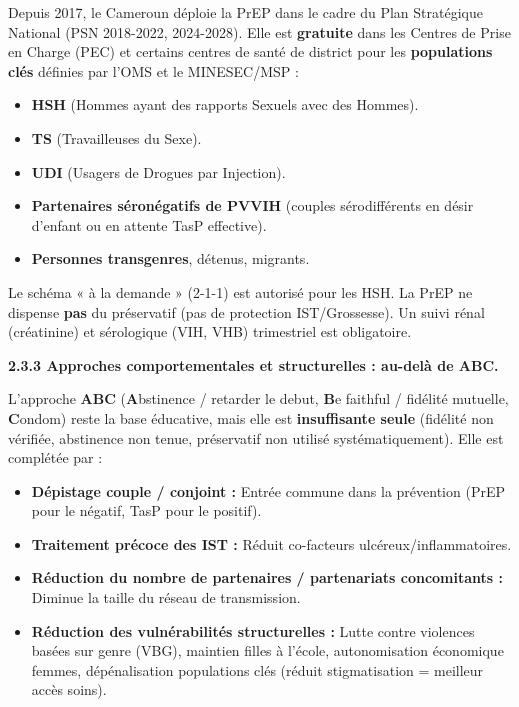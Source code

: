 \documentclass[11pt]{article}
\begin{document}
\begin{savaistu}
Depuis 2017, le Cameroun déploie la PrEP dans le cadre du Plan Stratégique National (PSN 2018-2022, 2024-2028). Elle est \textbf{gratuite} dans les Centres de Prise en Charge (PEC) et certains centres de santé de district pour les \textbf{populations clés} définies par l'OMS et le MINESEC/MSP :
\begin{itemize}
    \item \textbf{HSH} (Hommes ayant des rapports Sexuels avec des Hommes).
    \item \textbf{TS} (Travailleuses du Sexe).
    \item \textbf{UDI} (Usagers de Drogues par Injection).
    \item \textbf{Partenaires séronégatifs de PVVIH} (couples sérodifférents en désir d'enfant ou en attente TasP effective).
    \item \textbf{Personnes transgenres}, détenus, migrants.
\end{itemize}
Le schéma « à la demande » (2-1-1) est autorisé pour les HSH. La PrEP ne dispense \textbf{pas} du préservatif (pas de protection IST/Grossesse). Un suivi rénal (créatinine) et sérologique (VIH, VHB) trimestriel est obligatoire.
\end{savaistu}

\textbf{2.3.3 Approches comportementales et structurelles : au-delà de ABC.}\par
L'approche \textbf{ABC} (\textbf{A}bstinence / retarder le debut, \textbf{B}e faithful / fidélité mutuelle, \textbf{C}ondom) reste la base éducative, mais elle est \textbf{insuffisante seule} (fidélité non vérifiée, abstinence non tenue, préservatif non utilisé systématiquement). Elle est complétée par :
\begin{itemize}
    \item \textbf{Dépistage couple / conjoint :} Entrée commune dans la prévention (PrEP pour le négatif, TasP pour le positif).
    \item \textbf{Traitement précoce des IST :} Réduit co-facteurs ulcéreux/inflammatoires.
    \item \textbf{Réduction du nombre de partenaires / partenariats concomitants :} Diminue la taille du réseau de transmission.
    \item \textbf{Réduction des vulnérabilités structurelles :} Lutte contre violences basées sur genre (VBG), maintien filles à l'école, autonomisation économique femmes, dépénalisation populations clés (réduit stigmatisation = meilleur accès soins).
\end{itemize}
\end{document}
